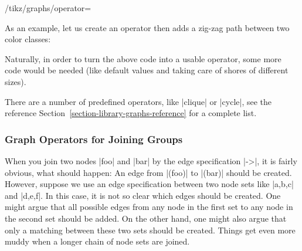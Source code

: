 \begin{key}{/tikz/graphs/operator=}
\begin{command}{\tikzgraphpreparecolor{}}
        As an example, let us create an operator then adds a zig-zag path
        between two color classes:
\begin{codeexample}[preamble={\usetikzlibrary{graphs}}]
\newcount\leftshorecount   \newcount\rightshorecount
\newcount\mycount          \newcount\myothercount
\def\zigzag{
  \tikzgraphpreparecolor{left shore}\leftshorecount{left shore prefix}
  \tikzgraphpreparecolor{right shore}\rightshorecount{right shore prefix}
  \mycount=0\relax
  \loop
    \advance\mycount by 1\relax%
    \tikzgraphsset{new ->=
      {\csname left shore prefix\the\mycount\endcsname}
      {\csname right shore prefix\the\mycount\endcsname}{}{}}
    \myothercount=\mycount\relax%
    \advance\myothercount by1\relax%
    \tikzgraphsset{new <-=
      {\csname left shore prefix\the\myothercount\endcsname}
      {\csname right shore prefix\the\mycount\endcsname}{}{}}
  \ifnum\myothercount<\leftshorecount\relax
  \repeat
}
\end{codeexample}
        Naturally, in order to turn the above code into a usable operator, some
        more code would be needed (like default values and taking care of
        shores of different sizes).
    \end{command}
\end{key}

There are a number of predefined operators, like |clique| or |cycle|, see the
reference Section~\ref{section-library-graphs-reference} for a complete list.


\subsubsection{Graph Operators for Joining Groups}
\label{section-library-graphs-join}

When you join two nodes |foo| and |bar| by the edge specification |->|, it is
fairly obvious, what should happen: An edge from |(foo)| to |(bar)| should be
created. However, suppose we use an edge specification between two node sets
like |{a,b,c}| and |{d,e,f}|. In this case, it is not so clear which edges
should be created. One might argue that all possible edges from any node in the
first set to any node in the second set should be added. On the other hand, one
might also argue that only a matching between these two sets should be created.
Things get even more muddy when a longer chain of node sets are joined.

